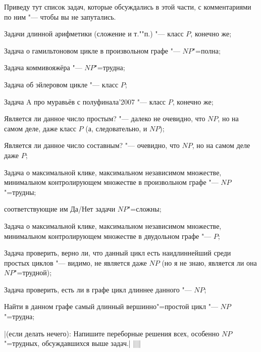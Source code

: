 { Приведу тут список задач, которые обсуждались в этой 
части, с комментариями по ним "--- чтобы вы не запутались.
\begin{ulist}
\item Задачи длинной арифметики (сложение и т.""п.) "--- класс $P$, конечно же;
\item Задача о гамильтоновом цикле в произвольном графе "--- $NP$"=полна;
\item Задача коммивояжёра "--- $NP$"=трудна;
\item Задача об эйлеровом цикле "--- класс $P$;
\item Задача A про муравьёв с полуфинала'2007 "--- класс $P$, конечно же;
\item Является ли данное число простым? "--- далеко не очевидно, что $NP$, но 
на самом деле, даже класс $P$ (а, следовательно, и $NP$);
\item Является ли данное число составным? "--- очевидно, что $NP$, но 
на самом деле даже $P$;
\item Задача о максимальной клике, максимальном независимом множестве, 
минимальном контролирующем множестве в произвольном графе "--- $NP$"=трудны;

соответствующие им Да/Нет задачи $NP$"=сложны;
\item Задача о максимальной клике, максимальном независимом множестве, 
минимальном контролирующем множестве в двудольном графе "--- $P$;
\item Задача проверить, верно ли, что данный цикл есть наидлиннейший среди 
простых циклов "--- видимо, не является даже $NP$ (но я не знаю, является ли она $NP$"=трудной);
\item Задача проверить, есть ли в графе цикл длиннее данного "--- $NP$;
\item Найти в данном графе самый длинный вершинно"=простой цикл "--- $NP$"=трудна;
\end{ulist}

|(если делать нечего): Напишите переборные решения всех, особенно $NP$"=трудных, обсуждавшихся выше задач.|
||||

}